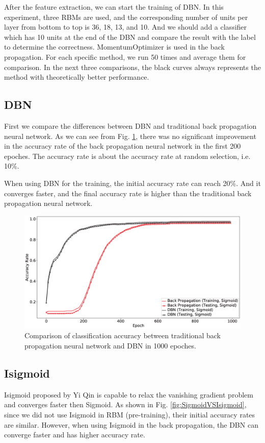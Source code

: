 \documentclass{bioinfo}
\begin{document}
After the feature extraction, we can start the training of DBN. In this experiment, three RBMs are used, and the corresponding number of units per layer from bottom to top is 36, 18, 13, and 10. And we should add a classifier which has 10 units at the end of the DBN and compare the result with the label to determine the correctness. MomentumOptimizer is used in the back propagation. For each specific method, we run 50 times and average them for comparison. In the next three comparisons, the black curves always represents the method with theoretically better performance.

\subsection{DBN}
First we compare the differences between DBN and traditional back propagation neural network. As we can see from Fig. \ref{fig:dbnVSbp}, there was no significant improvement in the accuracy rate of the back propagation neural network in the first 200 epoches. The accuracy rate is about the accuracy rate at random selection, i.e. 10\%. 

When using DBN for the training, the initial accuracy rate can reach 20\%. And it converges faster, and the final accuracy rate is higher than the traditional back propagation neural network.

\begin{figure}[htbp]
	\centering
	\includegraphics[width=\columnwidth]{dbnVSbp.eps}
	\caption{Comparison of classification accuracy between traditional back propagation neural network and DBN in 1000 epoches.}
	\label{fig:dbnVSbp}
\end{figure}

\subsection{Isigmoid}
Isigmoid proposed by Yi Qin \cite{YiThe} is capable to relax the vanishing gradient problem and converges faster then Sigmoid. As shown in Fig. \ref{fig:SigmoidVSIsigmoid}, since we did not use Isigmoid in RBM (pre-training), their initial accuracy rates are similar. However, when using Isigmoid in the back propagation, the DBN can converge faster and has higher accuracy rate.
\end{document}
